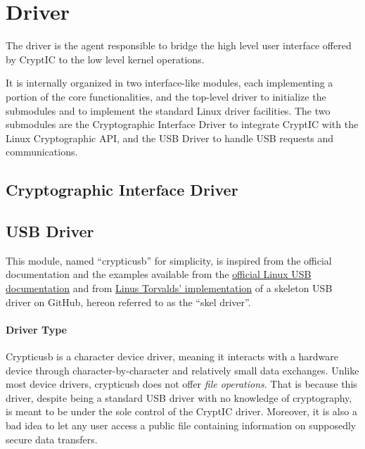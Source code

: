 \section{Driver}
The driver is the agent responsible to bridge the high level user interface offered by CryptIC to the low level kernel operations.

It is internally organized in two interface-like modules, each implementing a portion of the core functionalities, and the top-level driver to initialize the submodules and to implement the standard Linux driver facilities. The two submodules are the Cryptographic Interface Driver to integrate CryptIC with the Linux Cryptographic API, and the USB Driver to handle USB requests and communications.

\subsection{Cryptographic Interface Driver}
\subsection{USB Driver}
This module, named ``crypticusb'' for simplicity, is inspired from the official documentation and the examples available from the \href{http://www.linux-usb.org/}{official Linux USB documentation} and from \href{https://github.com/torvalds/linux/blob/master/drivers/usb/usb-skeleton.c}{Linus Torvalds' implementation} of a skeleton USB driver on GitHub, hereon referred to as the ``skel driver''.

\paragraph{Driver Type} Crypticusb is a character device driver, meaning it interacts with a hardware device through character-by-character and relatively small data exchanges. Unlike most device drivers, crypticusb does not offer \textit{file operations}. That is because this driver, despite being a standard USB driver with no knowledge of cryptography, is meant to be under the sole control of the CryptIC driver. Moreover, it is also a bad idea to let any user access a public file containing information on supposedly secure data transfers.

